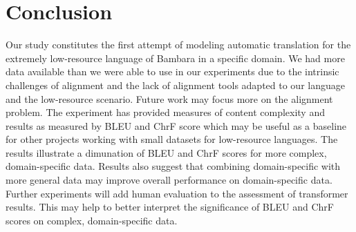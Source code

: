 \documentclass[11pt,a4paper]{article}
\begin{document}
\section{Conclusion}
Our study constitutes the first attempt of modeling automatic translation for the extremely low-resource language of Bambara in a specific domain. We had more data available than we were able to use in our experiments due to the intrinsic challenges of alignment and the lack of alignment tools adapted to our language and the low-resource scenario. Future work may focus more on the alignment problem. The experiment has provided measures of content complexity and results as measured by BLEU and ChrF score which may be useful as a baseline for other projects working with small datasets for low-resource languages. The results illustrate a dimunation of BLEU and ChrF scores for more complex, domain-specific data. Results also suggest that combining domain-specific with more general data may improve overall performance on domain-specific data. Further experiments will add human evaluation to the assessment of transformer results. This may help to better interpret the significance of BLEU and ChrF scores on complex, domain-specific data.




\appendix
\end{document}
